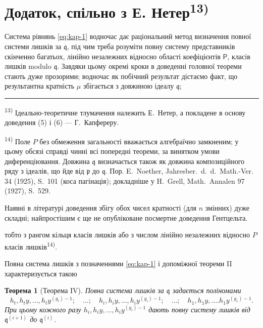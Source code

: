 \documentclass[11pt]{article}
\newcommand{\foreign}[1]{#1}
\theoremstyle{plain}
\newtheorem{satz}{Теорема}
\begin{document}
\newpage
\section*{Додаток, спільно з Е. Нетер\textsuperscript{13)}}

Система рівнянь \eqref{eq:kap-1} водночас дає раціональний метод
визначення повної системи лишків за $\mathfrak{q}$, під чим треба
розуміти повну систему представників скінченно багатьох, лінійно
незалежних відносно області коефіцієнтів $\mathsf{P}$, класів лишків modulo
$\mathfrak{q}$. Завдяки цьому окремі кроки в доведенні головної
теореми стають дуже прозорими; водночас як побічний результат
дістаємо факт, що результантна кратність $\mu$ збігається з
довжиною ідеалу $\mathfrak{q}$;

\vspace{0.5em}
\noindent\rule{\textwidth}{0.4pt}
\vspace{0.3em}

{\footnotesize
\textsuperscript{13)} Ідеально-теоретичне тлумачення належить Е.\ Нетер, а
покладене в основу доведення (5) і (6) --- Г.\ Капфереру.

\textsuperscript{14)} Поле $P$ без обмеження загальності вважається
алгебраїчно замкненим; у цьому обсязі справді чинні всі попередні
теореми, за винятком умови диференціювання. Довжина $\mathfrak{q}$
визначається також як довжина композиційного ряду з ідеалів, що йде
від $\mathfrak{p}$ до $\mathfrak{q}$. Пор. E.\ Noether,
\foreign{Jahresber.\ d.\ d.\ Math.-Ver.} 34 (1925), S.~101
(коса пагінація); докладніше у H.\ Grell, \foreign{Math.\ Annalen} 97
(1927), S.~529.

Наявні в літературі доведення збігу обох чисел кратності (для $n$
змінних) дуже складні; найпростішим є ще не опубліковане посмертне
доведення Гентцельта.
}

\vspace{1em}
тобто з рангом кільця класів лишків або з числом лінійно незалежних
відносно $P$ класів лишків\textsuperscript{14)}.

Повна система лишків з позначеннями \eqref{eq:kap-1} і допоміжної
теореми II характеризується такою

\begin{satz}[Теорема IV]\label{satz:kap-IV}
Повна система лишків за $\mathfrak{q}$ задається поліномами
\[
h_{t}, h_{t}y, \ldots, h_{t}y^{(g_{t})-1}; \quad \ldots; \quad
h_{i}, h_{i}y, \ldots, h_{i}y^{(g_{i})-1}; \quad \ldots; \quad
h_{1}, h_{1}y, \ldots. h_{1}y^{(g_{1})-1}.
\]
При цьому кожного разу
$h_{i}, h_{i}y, \ldots, h_{i}y^{(g_{i})-1}$ дають повну систему
лишків від $\mathfrak{q}^{(i+1)}$ до $\mathfrak{q}^{(i)}$.
\end{satz}
\end{document}
